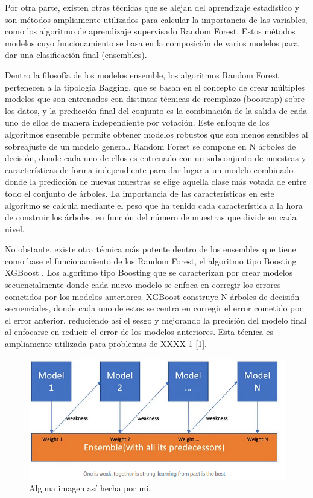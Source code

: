 \documentclass{uathesis-es}
\begin{document}
Por otra parte, existen otras técnicas que se alejan del aprendizaje estadístico y son métodos ampliamente utilizados para calcular la importancia de las variables, como los algoritmo de aprendizaje supervisado Random Forest. Estos métodos modelos cuyo funcionamiento se basa en la composición de varios modelos para dar una clasificación final (ensembles).

Dentro la filosofía de los modelos ensemble, los algoritmos Random Forest pertenecen a la tipología Bagging, que se basan en el concepto de crear múltiples modelos que son entrenados con distintas técnicas de reemplazo (boostrap) sobre los datos, y la predicción final del conjunto es la combinación de la salida de cada uno de ellos de manera independiente por votación. Este enfoque de los algoritmos ensemble permite obtener modelos robustos que son menos sensibles al sobreajuste de un modelo general. Random Forest se compone en N árboles de decisión, donde cada uno de ellos es entrenado con un subconjunto de muestras y características de forma independiente para dar lugar a un modelo combinado donde la predicción de nuevas muestras se elige aquella clase más votada de entre todo el conjunto de árboles. La importancia de las características en este algoritmo se calcula mediante el peso que ha tenido cada característica a la hora de construir los árboles, en función del número de muestras que divide en cada nivel.

No obstante, existe otra técnica más potente dentro de los ensembles que tiene como base el funcionamiento de los Random Forest, el algoritmo tipo Boosting XGBoost \cite{Chen_2016}. Los algoritmo tipo Boosting que se caracterizan por crear modelos secuencialmente donde cada nuevo modelo se enfoca en corregir los errores cometidos por los modelos anteriores. XGBoost construye N árboles de decisión secuenciales, donde cada uno de estos se centra en corregir el error cometido por el error anterior, reduciendo así el sesgo y mejorando la precisión del modelo final al enfocarse en reducir el error de los modelos anteriores. Esta técnica es ampliamente utilizada para problemas de XXXX \ref{BoostingExample} [1].

\begin{figure}[H]
    \centering
    \includegraphics[width=14cm]{Figures/boosting_example.png}
    \caption{Alguna imagen así hecha por mi.}
    \label{BoostingExample}
\end{figure}
\end{document}
